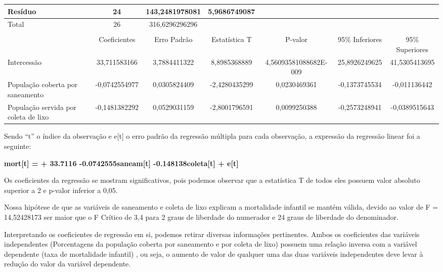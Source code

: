 \begin{table}[H]
{\begin{tabular}{|l|c|c|c|c|c|c|}
Resíduo                              & 24                    & 143,2481978081        & 5,9686749087          &                       &                       &                       \\ \hline
Total                                & 26                    & 316,6296296296        &                       &                       &                       &                       \\ \hline
                                     & \multicolumn{1}{l|}{} & \multicolumn{1}{l|}{} & \multicolumn{1}{l|}{} & \multicolumn{1}{l|}{} & \multicolumn{1}{l|}{} & \multicolumn{1}{l|}{} \\ \hline
                                     & Coeficientes          & Erro Padrão           & Estatística T         & P-valor               & 95\% Inferiores       & 95\% Superiores       \\ \hline
Intercessão                          & 33,711583166          & 3,7884411322          & 8,8985368889          & 4,56093581088682E-009 & 25,8926249625         & 41,5305413695         \\ \hline
População coberta por saneamento     & -0,0742554977         & 0,0305824409          & -2,4280435299         & 0,0230469361          & -0,1373745534         & -0,011136442          \\ \hline
População servida por coleta de lixo & -0,1481382292         & 0,0529031159          & -2,8001796591         & 0,0099250388          & -0,2573248941         & -0,0389515643         \\ \hline
\end{tabular}%
}
\end{table}

Sendo “t” o índice da observação e e[t] o erro padrão da regressão múltipla para cada observação, a expressão da regressão linear foi a seguinte:

\textbf{mort[t] = + 33.7116 -0.0742555saneam[t] -0.148138coleta[t] + e[t]}

Os coeficientes da regressão se mostram significativos, pois podemos observar que a estatística T de todos eles possuem valor absoluto superior a 2 e p-valor inferior a 0,05.

Nossa hipótese de que as variáveis de saneamento e coleta de lixo explicam a mortalidade infantil se mantém válida, devido ao valor de F = 14,52428173 ser maior que o F Crítico
de 3,4 para 2 graus de liberdade do numerador e 24 graus de liberdade do denominador.

Interpretando os coeficientes de regressão em si, podemos retirar diversas informações pertinentes. Ambos os coeficientes das variáveis independentes (Porcentagens da população
coberta por saneamento e por coleta de lixo) possuem uma relação inversa com a variável dependente (taxa de mortalidade infantil) , ou seja, o aumento de valor de qualquer uma das
duas variáveis independentes deve levar à redução do valor da variável dependente.

